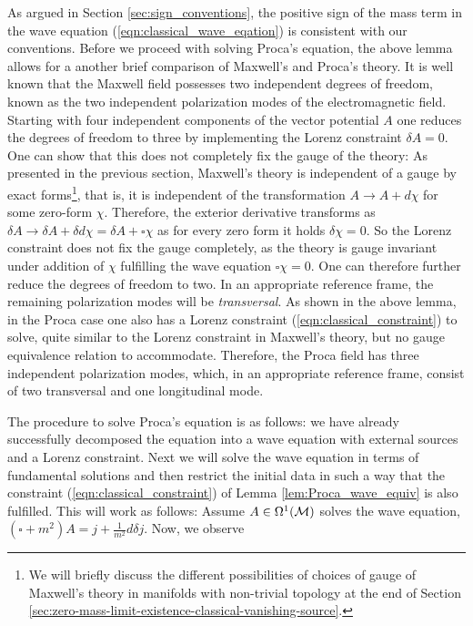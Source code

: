 \noindent As argued in Section \ref{sec:sign_conventions}, the positive sign of the mass term in the wave equation (\ref{eqn:classical_wave_eqation}) is consistent with our conventions. Before we proceed with solving Proca's equation, the above lemma allows for a another brief comparison of Maxwell's and Proca's theory. It is well known that the Maxwell field possesses two independent degrees of freedom, known as the two independent polarization modes of the electromagnetic field. Starting with four independent components of the vector potential $A$ one reduces the degrees of freedom to three by implementing the Lorenz constraint $\delta A = 0$. One can show that this does not completely fix the gauge of the theory: As presented in the previous section, Maxwell's theory is independent of a gauge by exact forms\footnote{We will briefly discuss the different possibilities of choices of gauge of Maxwell's theory in manifolds with non-trivial topology at the end of Section \ref{sec:zero-mass-limit-existence-classical-vanishing-source}.}, that is, it is independent of the transformation $A \to A + d\chi$ for some zero-form $\chi$. Therefore, the exterior derivative transforms as $\delta A \to \delta A + \delta d \chi = \delta A + \square \chi$ as for every zero form it holds $\delta \chi = 0$. So the Lorenz constraint does not fix the gauge completely, as the theory is gauge invariant under addition of $\chi$ fulfilling the wave equation $\square \chi=0$. One can therefore further reduce the degrees of freedom to two. In an appropriate reference frame, the remaining polarization modes will be \emph{transversal}. As shown in the above lemma, in the Proca case one also has a Lorenz constraint (\ref{eqn:classical_constraint}) to solve, quite similar to the Lorenz constraint in Maxwell's theory, but no gauge equivalence relation to accommodate. Therefore, the Proca field has three independent polarization modes, which, in an appropriate reference frame, consist of two transversal and one longitudinal mode.\par
%
%
%
The procedure to solve Proca's equation is as follows: we have already successfully decomposed the equation into a wave equation with external sources and a Lorenz constraint. Next we will solve the wave equation in terms of fundamental solutions and then restrict the initial data in such a way that the constraint (\ref{eqn:classical_constraint}) of Lemma \ref{lem:Proca_wave_equiv} is also fulfilled. This will work as follows:
Assume $A\in \Omega^1(\mathcal{M})$ solves the wave equation, $(\square +m^2)A =  j + \frac{1}{m^2} d \delta j$. Now, we observe
